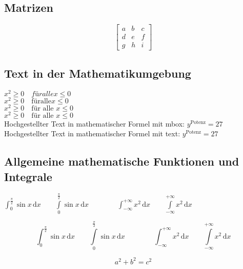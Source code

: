 \documentclass[10pt, a4paper]{article}
\numberwithin{equation}{section}
\numberwithin{figure}{section}
\begin{document}
\subsection{Matrizen}

\begin{equation}
\begin{bmatrix}
  a & b & c \\
  d & e & f \\
  g & h & i
 \end{bmatrix}
\end{equation}

\subsection{Text in der Mathematikumgebung}
\( x^2 \geq 0\quad für alle x \leq 0 \)\\ %
\( x^2 \geq 0\quad \mathrm{für alle } x \leq 0 \)\\ %
\( x^2 \geq 0\quad \mbox{für alle } x \leq 0 \)\\ %
\( x^2 \geq 0\quad \text{für alle } x \leq 0 \)\\ %
Hochgestellter Text in mathematischer Formel mit mbox: \quad \( y^{\mbox{Potenz}}=27\)\\
Hochgestellter Text in mathematischer Formel mit text: \quad \( y^{\text{Potenz}}=27\)

\subsection{Allgemeine mathematische Funktionen und Integrale}

\( \int_{0}^{\frac{\pi}{2}} \sin x\,\mathrm{d}x \qquad
\int\limits_{0}^{\frac{\pi}{2}} \sin x\,\mathrm{d}x \qquad\qquad
\int_{-\infty}^{+\infty}x^2\,\mathrm{d}x \qquad
\int\limits_{-\infty}^{+\infty}x^2\,\mathrm{d}x\)

\[ \int_{0}^{\frac{\pi}{2}} \sin x\,\mathrm{d}x \qquad
\int\limits_{0}^{\frac{\pi}{2}} \sin x\,\mathrm{d}x \qquad\qquad
\int_{-\infty}^{+\infty}x^2\,\mathrm{d}x \qquad
\int\limits_{-\infty}^{+\infty}x^2\,\mathrm{d}x\]



\begin{equation}
 	a^2 + b^2 = c^2\label{eq:a}
\end{equation}
\end{document}
